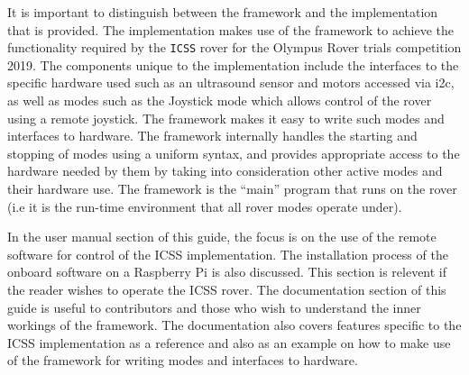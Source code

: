 It is important to distinguish between the framework and the implementation that is provided. The implementation makes use of the framework to achieve the functionality required by the \texttt{ICSS} rover for the Olympus Rover trials competition 2019. The components unique to the implementation include the interfaces to the specific hardware used such as an ultrasound sensor and motors accessed via i2c, as well as modes such as the Joystick mode which allows control of the rover using a remote joystick. The framework makes it easy to write such modes and interfaces to hardware. The framework internally handles the starting and stopping of modes using a uniform syntax, and provides appropriate access to the hardware needed by them by taking into consideration other active modes and their hardware use. The framework is the ``main'' program that runs on the rover (i.e it is the run-time environment that all rover modes operate under).

In the user manual section of this guide, the focus is on the use of the remote software for control of the ICSS implementation. The installation process of the onboard software on a Raspberry Pi is also discussed. This section is relevent if the reader wishes to operate the ICSS rover. The documentation section of this guide is useful to contributors and those who wish to understand the inner workings of the framework. The documentation also covers features specific to the ICSS implementation as a reference and also as an example on how to make use of the framework for writing modes and interfaces to hardware.